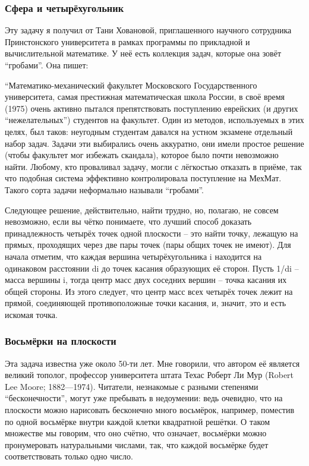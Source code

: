 \subsubsection*{Сфера и четырёхугольник}%

Эту задачу я получил от Тани Ховановой, приглашенного научного сотрудника Принстонского университета в рамках программы по прикладной и вычислительной математике.
У неё есть коллекция задач, которые она зовёт “гробами”.
Oна пишет:

“Математико-механический факультет Московского Государственного университета, самая престижная математическая школа России, в своё время (1975) очень активно пытался препятствовать поступлению еврейских (и других “нежелательных”) студентов на факультет.
Один из методов, используемых в этих целях, был таков: неугодным студентам давался на устном экзамене отдельный набор задач.
Задачи эти выбирались очень аккуратно, они имели простое решение (чтобы факультет мог избежать скандала), которое было почти невозможно найти.
Любому, кто проваливал задачу, могли с лёгкостью отказать в приёме, так что подобная система эффективно контролировала поступление на МехМат.
Такого сорта задачи неформально называли “гробами”. 

Следующее решение, действительно, найти трудно, но, полагаю, не совсем невозможно, если вы чётко понимаете, что лучший способ доказать принадлежность четырёх точек одной плоскости -- это найти точку, лежащую на прямых, проходящих через две пары точек (пары общих точек не имеют).
Для начала отметим, что каждая вершина четырёхугольника i находится на одинаковом расстоянии di до точек касания образующих её сторон.
Пусть 1/di -- масса вершины i, тогда центр масс двух соседних вершин -- точка касания их общей стороны.
Из этого следует, что центр масс всех четырёх точек лежит на прямой, соединяющей противоположные точки касания, и,
значит, это и есть искомая точка.

\subsubsection*{Восьмёрки на плоскости}%

Эта задача известна уже около 50-ти лет.
Мне говорили, что автором её является великий тополог, профессор университета штата Техас Роберт Ли Мур (Robert Lee Moore; 1882—1974).
Читатели, незнакомые с разными степенями “бесконечности”, могут уже пребывать в недоумении: ведь очевидно, что на плоскости можно нарисовать бесконечно много восьмёрок, например, поместив по одной восьмёрке внутри каждой клетки квадратной решётки.
О таком множестве мы говорим, что оно счётно, что означает, восьмёрки можно пронумеровать натуральными числами, так, что каждой восьмёрке будет соответствовать только одно число.

